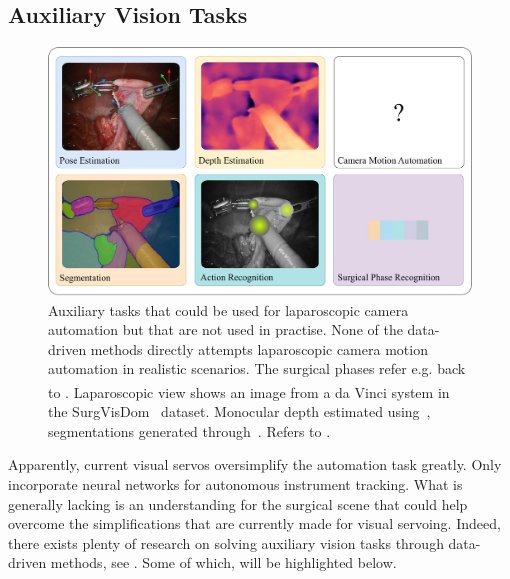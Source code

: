 \subsection{Auxiliary Vision Tasks}
\label{in:sec:auxiliary_tasks}
\begin{figure}[tb]
    \centering
    \includegraphics[width=\textwidth]{introduction/fig/auxiliary_tasks.pdf}
    \caption{Auxiliary tasks that could be used for laparoscopic camera automation but that are not used in practise. None of the data-driven methods directly attempts laparoscopic camera motion automation in realistic scenarios. The surgical phases refer e.g. back to . Laparoscopic view shows an image from a da Vinci\textsuperscript{\textregistered} system in the SurgVisDom~\cite{zia2021surgical} dataset. Monocular depth estimated using~\cite{oquab2023dinov2}, segmentations generated through~\cite{Kirillov:arxiv:2023}. Refers to .}
    \label{in:fig:auxiliary_tasks}
\end{figure}
Apparently, current visual servos oversimplify the automation task greatly. Only~\cite{gruijthuijsen2021autonomous} incorporate neural networks for autonomous instrument tracking. What is generally lacking is an understanding for the surgical scene that could help overcome the simplifications that are currently made for visual servoing. Indeed, there exists plenty of research on solving auxiliary vision tasks through data-driven methods, see . Some of which, will be highlighted below. 

